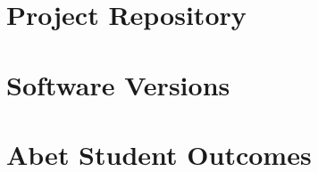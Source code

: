 \documentclass[12pt]{report}
\begin{document}
    \clearpage
    \appendix
    \chapter{Project Repository}
    \label{appendix:appendix_github}
    

    \clearpage
    \chapter{Software Versions}
    \label{appendix:appendix_versions}
    

    \chapter{Abet Student Outcomes}
    \label{appendix:appendix_abet}
    
\end{document}
